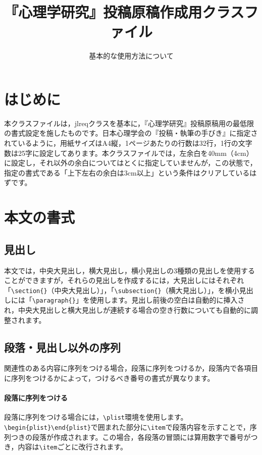 \documentclass{jjpsy}
\title{『心理学研究』投稿原稿作成用クラスファイル}{Class file for preparing a manuscript for submission to Journal of Psychological Research}
\subtitle{基本的な使用方法について}{Basic instructions}
\begin{document}
\pagewiselinenumbers %
\maketitle
\section{はじめに}

本クラスファイルは，jlreqクラスを基本に，『心理学研究』投稿原稿用の最低限の書式設定を施したものです。日本心理学会の『投稿・執筆の手びき』\parencite{日本心理学会2022}に指定されているように，用紙サイズはA4縦，1ページあたりの行数は32行，1行の文字数は25字に設定してあります。本クラスファイルでは，左余白を40mm（4cm）に設定し，それ以外の余白についてはとくに指定していませんが，この状態で，指定の書式である「上下左右の余白は3cm以上」という条件はクリアしているはずです。

\section{本文の書式}
\subsection{見出し}
本文では，中央大見出し，横大見出し，横小見出しの3種類の見出しを使用することができますが，それらの見出しを作成するには，大見出しにはそれぞれ「\texttt{\textbackslash{}section\{\}}（中央大見出し）」，「\texttt{\textbackslash{}subsection\{\}}（横大見出し）」，を横小見出しには「\texttt{\textbackslash{}paragraph\{\}}」を使用します。見出し前後の空白は自動的に挿入され，中央大見出しと横大見出しが連続する場合の空き行数についても自動的に調整されます。

\subsection{段落・見出し以外の序列}

関連性のある内容に序列をつける場合，段落に序列をつけるか，段落内で各項目に序列をつけるかによって，つけるべき番号の書式が異なります。

\paragraph{段落に序列をつける}
段落に序列をつける場合には，\texttt{\textbackslash{}plist}環境を使用します。\texttt{\textbackslash{}begin\{plist\}}\dash\texttt{\textbackslash{}end\{plist\}}で囲まれた部分に\texttt{\textbackslash{}item}で段落内容を示すことで，序列つきの段落が作成されます。この場合，各段落の冒頭には算用数字で番号がつき，内容は\texttt{\textbackslash{}item}ごとに改行されます。
\end{document}
